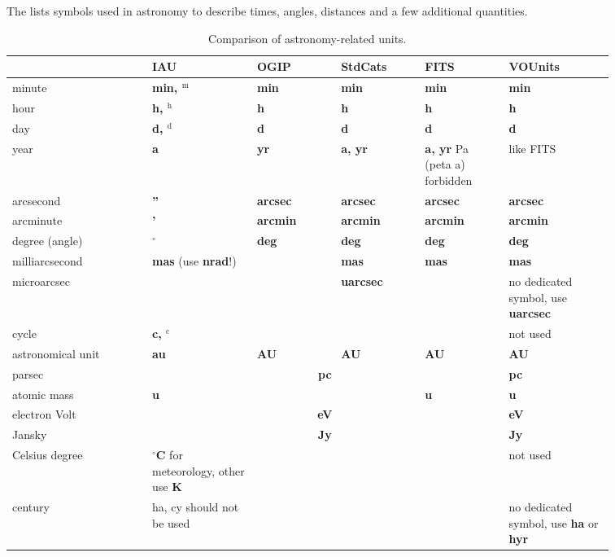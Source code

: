 \documentclass[12pt,notitlepage,onecolumn]{ivoa}
\newcommand{\unit}[1]{\textbf{\textsf{\color{orange}#1}}}
\begin{document}
The  lists symbols used in astronomy to describe times, angles, distances and
a few additional quantities. 

\begin{table}
\begin{tabular}{|p{0.2\linewidth}|p{0.15\linewidth}|p{0.12\linewidth}|p{0.12\linewidth}|p{0.12\linewidth}|p{0.15\linewidth}|}
\hline
    & IAU & OGIP  & StdCats & FITS  & VOUnits\\\hline
    minute & \unit{min, $^\mathrm{m}$} & \unit{min} & \unit{min} & \unit{min} & \unit{min}\\\hline
    hour & \unit{h, $^\mathrm{h}$} & \unit{h} & \unit{h} & \unit{h} & \unit{h}\\\hline
    day & \unit{d, $^\mathrm{d}$} & \unit{d} & \unit{d} & \unit{d} & \unit{d}\\\hline
    year & \unit{a} & \unit{yr} & \unit{a, yr} & \unit{a, yr} Pa (peta a) forbidden& like FITS\\\hline
    arcsecond & \unit{''} & \unit{arcsec} & \unit{arcsec} & \unit{arcsec} & \unit{arcsec}\\\hline
    arcminute & \unit{'} & \unit{arcmin} & \unit{arcmin} & \unit{arcmin} & \unit{arcmin}\\\hline
    degree (angle) & \unit{$^\circ$} & \unit{deg} & \unit{deg} & \unit{deg} & \unit{deg}\\\hline
    milliarcsecond & \unit{mas} (use \unit{nrad}!)\raggedright &  & \unit{mas} & \unit{mas} & \unit{mas}\\\hline
    microarcsec &  &  & \unit{uarcsec} &  & no dedicated symbol, use
    \unit{uarcsec}\\\hline
    cycle & \unit{c, $^\mathrm{c}$} &  &  &  & not used\\\hline
    astronomical unit & \unit{au} & \unit{AU} & \unit{AU} & \unit{AU} & \unit{AU}\\\hline
    parsec & \multicolumn{4}{c|}{\unit{pc}} & \unit{pc}\\\hline
    atomic mass & \unit{u} &  &  & \unit{u} & \unit{u}\\\hline
    electron Volt & \multicolumn{4}{c|}{\unit{eV}} & \unit{eV}\\\hline
    Jansky & \multicolumn{4}{c|}{\unit{Jy}} & \unit{Jy}\\\hline
    Celsius degree & \unit{$^\circ$C} for meteorology, other use \unit{K}\raggedright&  &  &  & not used\\\hline
    century & ha, cy should not be used &  &  &  & no dedicated symbol, use \unit{ha} or \unit{hyr}\\\hline
\end{tabular}
  \caption{Comparison of astronomy-related units.}
  \label{tab:comparUnitAstro}
\end{table}
\end{document}

